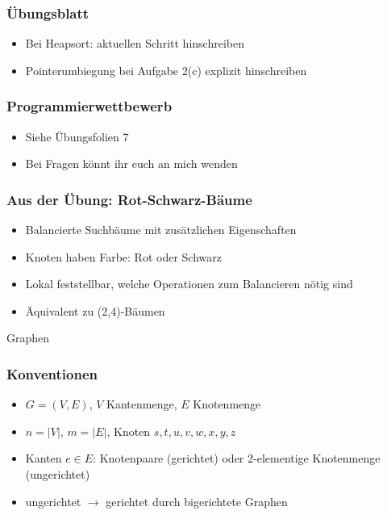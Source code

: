 

\begin{frame}
  \titlepage
\end{frame}

\begin{frame}
\frametitle{Übungsblatt}
\begin{itemize}
\item Bei Heapsort: aktuellen Schritt hinschreiben
\item Pointerumbiegung bei Aufgabe 2(c) explizit hinschreiben
\end{itemize}
\end{frame}

\begin{frame}
\frametitle{Programmierwettbewerb}
\begin{itemize}
\item Siehe Übungsfolien 7
\item Bei Fragen könnt ihr euch an mich wenden
\end{itemize}
\end{frame}

\begin{frame}
\frametitle{Aus der Übung: Rot-Schwarz-Bäume}
\begin{itemize}
\item Balancierte Suchbäume mit zusätzlichen Eigenschaften
\item Knoten haben Farbe: Rot oder Schwarz
\item Lokal feststellbar, welche Operationen zum Balancieren nötig sind\pause
\item Äquivalent zu (2,4)-Bäumen
\end{itemize}
\end{frame}

\begin{frame}
Graphen
\end{frame}

\begin{frame}
\frametitle{Konventionen}
\begin{itemize}
\item $G=(V,E)$, $V$ Kantenmenge, $E$ Knotenmenge\pause
\item $n=|V|$, $m=|E|$, Knoten $s,t,u,v,w,x,y,z$\pause
\item Kanten $e\in E$: Knotenpaare (gerichtet) oder 2-elementige Knotenmenge (ungerichtet)\pause
\item ungerichtet $\to$ gerichtet durch bigerichtete Graphen
\end{itemize}
\end{frame}

